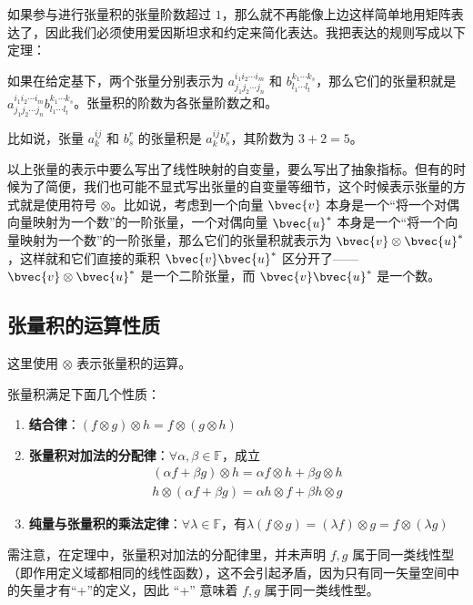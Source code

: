 如果参与进行张量积的张量阶数超过 $1$，那么就不再能像上边这样简单地用矩阵表达了，因此我们必须使用爱因斯坦求和约定来简化表达。我把表达的规则写成以下定理：

\begin{theorem}{}
如果在给定基下，两个张量分别表示为 $a^{i_1i_2\cdots i_m}_{j_1j_2\cdots j_n}$ 和 $b^{k_1\cdots k_s}_{l_1\cdots l_t}$，那么它们的张量积就是 $a^{i_1i_2\cdots i_m}_{j_1j_2\cdots j_n}b^{k_1\cdots k_s}_{l_1\cdots l_t}$。张量积的阶数为各张量阶数之和。
\end{theorem}

比如说，张量 $a^{ij}_k$ 和 $b^r_s$ 的张量积是 $a^{ij}_kb^r_s$，其阶数为 $3+2=5$。

以上张量的表示中要么写出了线性映射的自变量，要么写出了抽象指标。但有的时候为了简便，我们也可能不显式写出张量的自变量等细节，这个时候表示张量的方式就是使用符号 $\otimes$。比如说，考虑到一个向量 $\bvec{v}$ 本身是一个“将一个对偶向量映射为一个数”的一阶张量，一个对偶向量 $\bvec{u}^*$ 本身是一个“将一个向量映射为一个数”的一阶张量，那么它们的张量积就表示为 $\bvec{v}\otimes\bvec{u}^*$，这样就和它们直接的乘积 $\bvec{v}\bvec{u}^*$ 区分开了——$\bvec{v}\otimes\bvec{u}^*$ 是一个二阶张量，而 $\bvec{v}\bvec{u}^*$ 是一个数。

\subsection{张量积的运算性质}
这里使用 $\otimes$ 表示张量积的运算。
\begin{theorem}{}\label{TsrPrd_the1}
张量积满足下面几个性质：
\begin{enumerate}
\item \textbf{结合律}：$(f\otimes g)\otimes h=f\otimes (g\otimes h)$
\item \textbf{张量积对加法的分配律}：$\forall \alpha,\beta\in\mathbb F$，成立
\begin{equation}
\begin{aligned}
(\alpha f+\beta g)\otimes h=\alpha f\otimes h+\beta g\otimes h\\
h\otimes(\alpha f+\beta g)=\alpha h\otimes f+\beta h\otimes g
\end{aligned}
\end{equation}
\item \textbf{纯量与张量积的乘法定律}：$\forall \lambda\in\mathbb F$，有$\lambda (f\otimes g)=(\lambda f)\otimes g=f\otimes (\lambda g)$
\end{enumerate}
\end{theorem}
需注意，在定理中，张量积对加法的分配律里，并未声明 $f,g$ 属于同一类线性型（即作用定义域都相同的线性函数），这不会引起矛盾，因为只有同一矢量空间中的矢量才有“+”的定义，因此 “+” 意味着 $f,g$ 属于同一类线性型。

